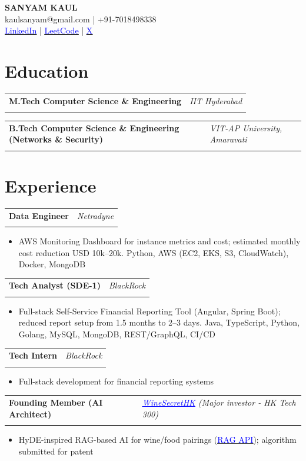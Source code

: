 \documentclass[11pt,a4paper]{article}
\makeatletter
\let\oldhref\href
\renewcommand{\href}[2]{\oldhref{#1}{\underline{\textcolor{blue}{#2}}}}
\newcommand{\resumeItem}[1]{\item\small{#1}}
\newlength{\resumeLeftCol}
\newlength{\resumeRightCol}
\newcommand{\resumeHeading}[4]{
  \begin{tabular*}{\textwidth}{@{}p{\resumeLeftCol}@{\extracolsep{\fill}}>{\raggedleft\arraybackslash}p{\resumeRightCol}@{}}
    \textbf{#1} & \textit{#2} \\
    & \textit{\ifstrempty{#4}{#3}{#3 \ #4}}
  \end{tabular*}
  \vspace{-2pt}
}
\makeatother
\begin{document}
\begin{center}
    {\Large\bfseries SANYAM KAUL} \\
    \vspace{0pt}
    \small kaulsanyam@gmail.com \;|\; +91-7018498338 \\
    \small \href{https://www.linkedin.com/in/kaulmesanyam/}{LinkedIn} \;|\; \href{https://leetcode.com/u/kaulmesanyam/}{LeetCode} \;|\; \href{https://x.com/kaulmesanyam}{X}
\end{center}
\vspace{1pt}

\section{Education}
\resumeHeading{M.Tech Computer Science \& Engineering}{IIT Hyderabad}{2025}{CGPA: 8.50}
\resumeHeading{B.Tech Computer Science \& Engineering (Networks \& Security)}{VIT-AP University, Amaravati}{2021}{CGPA: 8.90}

\section{Experience}
\resumeHeading{Data Engineer}{Netradyne}{Jul 2025 -- Present}{}
\begin{itemize}[leftmargin=*,noitemsep,topsep=0pt]
    \resumeItem{AWS Monitoring Dashboard for instance metrics and cost; estimated monthly cost reduction USD 10k--20k. Python, AWS (EC2, EKS, S3, CloudWatch), Docker, MongoDB}
\end{itemize}

\resumeHeading{Tech Analyst (SDE-1)}{BlackRock}{Jul 2021 -- Jun 2023}{}
\begin{itemize}[leftmargin=*,noitemsep,topsep=0pt]
    \resumeItem{Full-stack Self-Service Financial Reporting Tool (Angular, Spring Boot); reduced report setup from 1.5 months to 2--3 days. Java, TypeScript, Python, Golang, MySQL, MongoDB, REST/GraphQL, CI/CD}
\end{itemize}

\resumeHeading{Tech Intern}{BlackRock}{Jan 2021 -- Jul 2021}{}
\begin{itemize}[leftmargin=*,noitemsep,topsep=0pt]
    \resumeItem{Full-stack development for financial reporting systems}
\end{itemize}

\resumeHeading{Founding Member (AI Architect)}{\href{https://www.winesecrethk.com/}{WineSecretHK} (Major investor - HK Tech 300)}{Entrepreneurship}{}
\begin{itemize}[leftmargin=*,noitemsep,topsep=0pt]
    \resumeItem{HyDE-inspired RAG-based AI for wine/food pairings (\href{https://rag.winesecrethk.com/docs}{RAG API}); algorithm submitted for patent}
\end{itemize}
\end{document}
